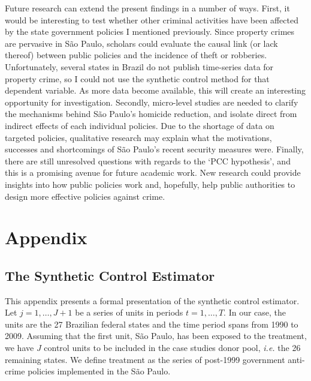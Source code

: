 Future research can extend the present findings in a number of ways. First, it would be interesting to test whether other criminal activities have been affected by the state government policies I mentioned previously. Since property crimes are pervasive in São Paulo, scholars could evaluate the causal link (or lack thereof) between public policies and the incidence of theft or robberies. Unfortunately, several states in Brazil do not publish time-series data for property crime, so I could not use the synthetic control method for that dependent variable. As more data become available, this will create an interesting opportunity for investigation. Secondly, micro-level studies are needed to clarify the mechanisms behind São Paulo's homicide reduction, and isolate direct from indirect effects of each individual policies. Due to the shortage of data on targeted policies, qualitative research may explain what the motivations, successes and shortcomings of São Paulo's recent security measures were. Finally, there are still unresolved questions with regards to the `PCC hypothesis', and this is a promising avenue for future academic work. New research could provide insights into how public policies work and, hopefully, help public authorities to design more effective policies against crime.

\newpage

\section{Appendix} 
\label{sec:synth-appendix}

\subsection{The Synthetic Control Estimator}
\label{sec:synth-estimator}

This appendix presents a formal presentation of the synthetic control estimator. Let $j = 1, \dots, J + 1$ be a series of units in periods $t = 1, \dots, T$. In our case, the units are the 27 Brazilian federal states and the time period spans from 1990 to 2009. Assuming that the first unit, São Paulo, has been exposed to the treatment, we have $J$ control units to be included in the case studies donor pool, \emph{i.e.} the 26 remaining states. We define treatment as the series of post-1999 government anti-crime policies implemented in the São Paulo.

